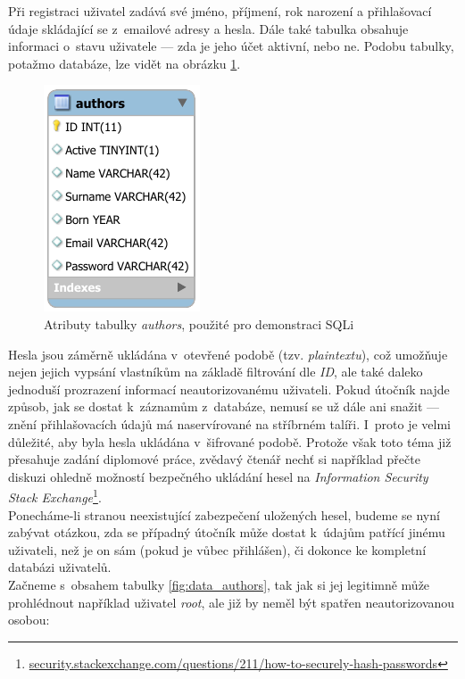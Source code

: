 Při registraci uživatel zadává své jméno, příjmení, rok narození a přihlašovací údaje skládající se z~emailové adresy a hesla. Dále také tabulka
obsahuje informaci o~stavu uživatele --- zda je jeho účet aktivní, nebo ne. Podobu tabulky, potažmo databáze, lze vidět na obrázku \ref{fig:authors}. \\

\begin{figure}[h!]
    \label{fig:authors}
    \centering
    \includegraphics[scale=1.4]{obrazky-figures/authors.pdf}
    \caption{Atributy tabulky \textit{authors}, použité pro demonstraci SQLi}
\end{figure}

Hesla jsou záměrně ukládána v~otevřené podobě (tzv. \textit{plaintextu}), což umožňuje nejen jejich vypsání vlastníkům na základě filtrování dle 
\textit{ID}, ale také daleko jednoduší prozrazení informací neautorizovanému uživateli. Pokud útočník najde způsob, jak se dostat k~záznamům 
z~databáze, nemusí se už dále ani snažit --- znění přihlašovacích údajů má naservírované na stříbrném talíři. I~proto je velmi důležité, aby byla 
hesla ukládána v~šifrované podobě. Protože však toto téma již přesahuje zadání diplomové práce, zvědavý čtenář nechť si například přečte diskuzi 
ohledně možností bezpečného ukládání hesel na \textit{Information Security Stack 
Exchange}\footnote{\url{security.stackexchange.com/questions/211/how-to-securely-hash-passwords}}. \\

Ponecháme-li stranou neexistující zabezpečení uložených hesel, budeme se nyní zabývat otázkou, zda se případný útočník může dostat k~údajům patřící
jinému uživateli, než je on sám (pokud je vůbec přihlášen), či dokonce ke kompletní databázi uživatelů. \\

\Bat{} Začneme s~obsahem tabulky \ref{fig:data_authors}, tak jak si jej legitimně může prohlédnout například \mbox{uživatel} \textit{root},
ale již by neměl být spatřen neautorizovanou osobou:

